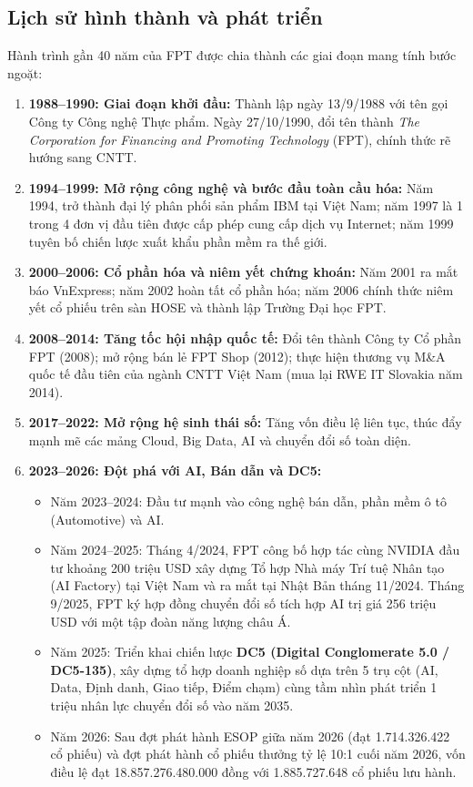 \subsection{Lịch sử hình thành và phát triển}
Hành trình gần 40 năm của FPT được chia thành các giai đoạn mang tính bước ngoặt:
\begin{enumerate}
    \item \textbf{1988--1990: Giai đoạn khởi đầu:} Thành lập ngày 13/9/1988 với tên gọi Công ty Công nghệ Thực phẩm. Ngày 27/10/1990, đổi tên thành \textit{The Corporation for Financing and Promoting Technology} (FPT), chính thức rẽ hướng sang CNTT.
    \item \textbf{1994--1999: Mở rộng công nghệ và bước đầu toàn cầu hóa:} Năm 1994, trở thành đại lý phân phối sản phẩm IBM tại Việt Nam; năm 1997 là 1 trong 4 đơn vị đầu tiên được cấp phép cung cấp dịch vụ Internet; năm 1999 tuyên bố chiến lược xuất khẩu phần mềm ra thế giới.
    \item \textbf{2000--2006: Cổ phần hóa và niêm yết chứng khoán:} Năm 2001 ra mắt báo VnExpress; năm 2002 hoàn tất cổ phần hóa; năm 2006 chính thức niêm yết cổ phiếu trên sàn HOSE và thành lập Trường Đại học FPT.
    \item \textbf{2008--2014: Tăng tốc hội nhập quốc tế:} Đổi tên thành Công ty Cổ phần FPT (2008); mở rộng bán lẻ FPT Shop (2012); thực hiện thương vụ M\&A quốc tế đầu tiên của ngành CNTT Việt Nam (mua lại RWE IT Slovakia năm 2014).
    \item \textbf{2017--2022: Mở rộng hệ sinh thái số:} Tăng vốn điều lệ liên tục, thúc đẩy mạnh mẽ các mảng Cloud, Big Data, AI và chuyển đổi số toàn diện.
    \item \textbf{2023--2026: Đột phá với AI, Bán dẫn và DC5:}
    \begin{itemize}
        \item Năm 2023--2024: Đầu tư mạnh vào công nghệ bán dẫn, phần mềm ô tô (Automotive) và AI.
        \item Năm 2024--2025: Tháng 4/2024, FPT công bố hợp tác cùng NVIDIA đầu tư khoảng 200 triệu USD xây dựng Tổ hợp Nhà máy Trí tuệ Nhân tạo (AI Factory) tại Việt Nam và ra mắt tại Nhật Bản tháng 11/2024. Tháng 9/2025, FPT ký hợp đồng chuyển đổi số tích hợp AI trị giá 256 triệu USD với một tập đoàn năng lượng châu Á.
        \item Năm 2025: Triển khai chiến lược \textbf{DC5 (Digital Conglomerate 5.0 / DC5-135)}, xây dựng tổ hợp doanh nghiệp số dựa trên 5 trụ cột (AI, Data, Định danh, Giao tiếp, Điểm chạm) cùng tầm nhìn phát triển 1 triệu nhân lực chuyển đổi số vào năm 2035.
        \item Năm 2026: Sau đợt phát hành ESOP giữa năm 2026 (đạt 1.714.326.422 cổ phiếu) và đợt phát hành cổ phiếu thưởng tỷ lệ 10:1 cuối năm 2026, vốn điều lệ đạt 18.857.276.480.000 đồng với 1.885.727.648 cổ phiếu lưu hành.
    \end{itemize}
\end{enumerate}

